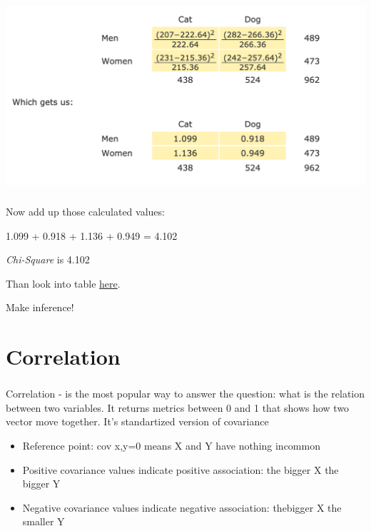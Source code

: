 \documentclass[t, 11pt]{beamer}
\begin{document}
		\begin{frame} 
		\frametitle{\insertsection} 	
		
		\begin{center}
			\includegraphics[scale=0.5]{chi5big}
		\end{center}
		
	\end{frame}

		\begin{frame} 
	\frametitle{\insertsection} 	
	
	Now add up those calculated values:
	
	1.099 + 0.918 + 1.136 + 0.949 = 4.102
	
	\emph{Chi-Square} is 4.102

	Than look into table \href{https://www.mathsisfun.com/data/chi-square-table.html}{here}.
	
	Make inference!
	\end{frame}
	
\section{Correlation}	

			\begin{frame} 
		\frametitle{\insertsection} 	
		Correlation - is the most popular way to answer the question: what is the relation between two variables. It returns metrics between 0 and 1 that shows how two vector move together. It's standartized version of covariance
		
		\begin{itemize}
			\item Reference point: cov x,y=0 means X and Y have nothing incommon
			\item Positive covariance values indicate positive association: the bigger X the bigger Y 
			\item Negative covariance values indicate negative association: thebigger X the smaller Y
		\end{itemize}

	\end{frame}
	
\end{document}
